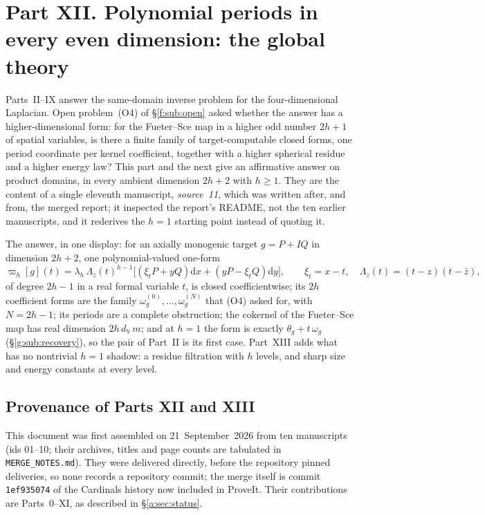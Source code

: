 \documentclass[11pt,a4paper]{article}
\numberwithin{equation}{section}
\theoremstyle{definition}
\theoremstyle{remark}
\theoremstyle{plain}
\newcommand{\om}{\omega}
\newcommand{\thet}{\theta}
\newcommand{\dd}{\mathrm d}
\newcommand{\VV}{\mathbb V}                       %
\newcommand{\dV}{d_{\VV}}                         %
\newcommand{\cur}{\varpi}                         %
\newcommand{\Rq}{\Lambda}                         %
\begin{document}
\section{Part XII. Polynomial periods in every even dimension: the global
theory}
\label{g:sec:global}

Parts~II--IX answer the same-domain inverse problem for the four-dimensional
Laplacian. Open problem~(O4) of \S\ref{f:sub:open} asked whether the answer
has a higher-dimensional form: for the Fueter--Sce map in a higher odd number
$2h+1$ of spatial variables, is there a finite family of target-computable
closed forms, one period coordinate per kernel coefficient, together with a
higher spherical residue and a higher energy law? This part and the next give
an affirmative answer on product domains, in every ambient dimension $2h+2$
with $h\ge1$. They are the content of a single eleventh manuscript,
\emph{source~11}, which was written after, and from, the merged report; it
inspected the report's README, not the ten earlier manuscripts, and it
rederives the $h=1$ starting point instead of quoting it.

The answer, in one display: for an axially monogenic target $g=P+IQ$ in
dimension $2h+2$, one polynomial-valued one-form
\[
 \cur_h[g](t)=\lambda_h\,\Rq_z(t)^{h-1}
 \bigl[(\xi_tP+yQ)\dd x+(yP-\xi_tQ)\dd y\bigr],
 \qquad \xi_t=x-t,\quad \Rq_z(t)=(t-z)(t-\bar z),
\]
of degree $2h-1$ in a real formal variable $t$, is closed coefficientwise; its
$2h$ coefficient forms are the family $\om^{(0)}_g,\dots,\om^{(N)}_g$ that (O4)
asked for, with $N=2h-1$; its periods are a complete obstruction; the cokernel
of the Fueter--Sce map has real dimension $2h\,\dV\,m$; and at $h=1$ the form is
exactly $\thet_g+t\,\om_g$ (\S\ref{g:sub:recovery}), so the pair of Part~II is
its first case. Part~XIII adds what has no nontrivial $h=1$ shadow: a residue
filtration with $h$ levels, and sharp size and energy constants at every
level.

\subsection{Provenance of Parts XII and XIII}
\label{g:sub:provenance}

This document was first assembled on 21~September~2026 from ten manuscripts
(ids 01--10; their archives, titles and page counts are tabulated in
\texttt{MERGE\_NOTES.md}). They were delivered directly, before the
repository pinned deliveries, so none records a repository commit; the merge
itself is commit \texttt{1ef935074} of the Cardinals history now included in
ProveIt. Their contributions are Parts~0--XI, as described in
\S\ref{a:sec:status}.
\end{document}
